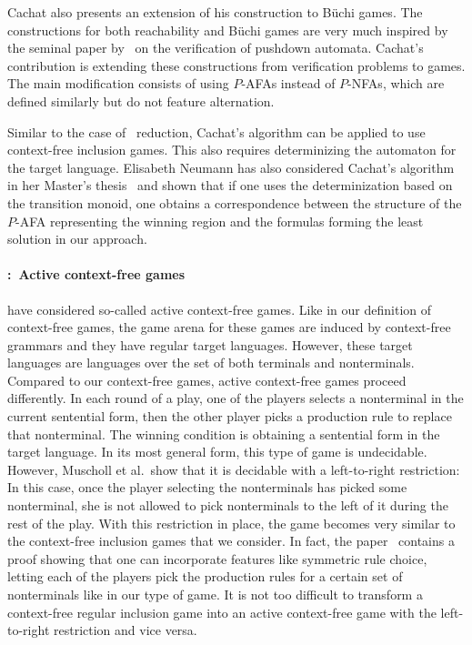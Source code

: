 \documentclass[../../diss.tex]{subfiles}
\begin{document}
Cachat also presents an extension of his construction to Büchi games.
The constructions for both reachability and Büchi games are very much inspired by the seminal paper by~\cite{BouajjaniEM97} on the verification of pushdown automata.
Cachat's contribution is extending these constructions from verification problems to games.
The main modification consists of using $P$-AFAs instead of $P$-NFAs, which are defined similarly but do not feature alternation.

Similar to the case of \Walus~reduction, Cachat's algorithm can be applied to use context-free inclusion games.
This also requires determinizing the automaton for the target language.
Elisabeth Neumann has also considered Cachat's algorithm in her Master's thesis~\cite{Neumann17} and shown that if one uses the determinization based on the transition monoid, one obtains a correspondence between the structure of the $P$-AFA representing the winning region and the formulas forming the least solution in our approach.

\paragraph{\citeauthor{MuschollSS06}:~Active context-free games}

 have considered so-called active context-free games.
Like in our definition of context-free games, the game arena for these games are induced by context-free grammars and they have regular target languages.
However, these target languages are languages over the set of both terminals and nonterminals.
Compared to our context-free games, active context-free games proceed differently.
In each round of a play, one of the players selects a nonterminal in the current sentential form, then the other player picks a production rule to replace that nonterminal.
The winning condition is obtaining a sentential form in the target language.
In its most general form, this type of game is undecidable.
However, Muscholl et al.~show that it is decidable with a left-to-right restriction:
In this case, once the player selecting the nonterminals has picked some nonterminal, she is not allowed to pick nonterminals to the left of it during the rest of the play.
With this restriction in place, the game becomes very similar to the context-free inclusion games that we consider.
In fact, the paper~\cite{MuschollSS06} contains a proof showing that one can incorporate features like symmetric rule choice, \ie letting each of the players pick the production rules for a certain set of nonterminals like in our type of game.
It is not too difficult to transform a context-free regular inclusion game into an active context-free game with the left-to-right restriction and vice versa.
\end{document}
